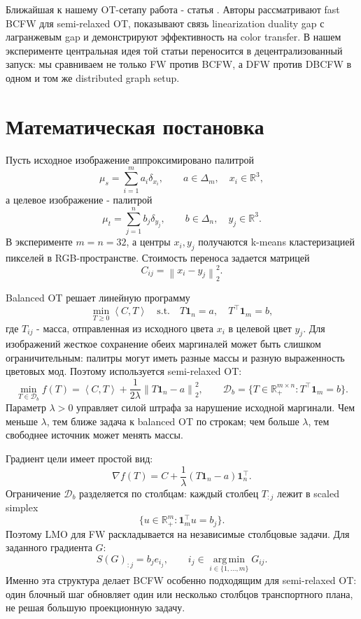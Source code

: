 \documentclass[11pt,a4paper]{article}
\newcommand{\R}{\mathbb{R}}
\newcommand{\1}{\mathbf{1}}
\newcommand{\argmin}{\operatorname*{arg\,min}}
\newcommand{\inner}[2]{\left\langle #1,#2\right\rangle}
\newcommand{\norm}[1]{\left\lVert #1\right\rVert}
\begin{document}
Ближайшая к нашему OT-сетапу работа - статья \citet{fukunaga2021fast}. Авторы рассматривают fast BCFW для semi-relaxed OT, показывают связь linearization duality gap с лагранжевым gap и демонстрируют эффективность на color transfer. В нашем эксперименте центральная идея той статьи переносится в децентрализованный запуск: мы сравниваем не только FW против BCFW, а DFW против DBCFW в одном и том же distributed graph setup.

\section{Математическая постановка}

Пусть исходное изображение аппроксимировано палитрой
\[
  \mu_s = \sum_{i=1}^{m} a_i \delta_{x_i},
  \qquad
  a \in \Delta_m,\quad x_i \in \R^3,
\]
а целевое изображение - палитрой
\[
  \mu_t = \sum_{j=1}^{n} b_j \delta_{y_j},
  \qquad
  b \in \Delta_n,\quad y_j \in \R^3.
\]
В эксперименте $m=n=32$, а центры $x_i,y_j$ получаются k-means кластеризацией пикселей в RGB-пространстве. Стоимость переноса задается матрицей
\[
  C_{ij} = \norm{x_i-y_j}_2^2.
\]

Balanced OT решает линейную программу
\[
  \min_{T \ge 0} \inner{C}{T}
  \quad \text{s.t.} \quad
  T\1_n=a,\quad T^\top\1_m=b,
\]
где $T_{ij}$ - масса, отправленная из исходного цвета $x_i$ в целевой цвет $y_j$. Для изображений жесткое сохранение обеих маргиналей может быть слишком ограничительным: палитры могут иметь разные массы и разную выраженность цветовых мод. Поэтому используется semi-relaxed OT:
\begin{equation}
\label{eq:semi-relaxed}
  \min_{T\in\mathcal{D}_b}
  f(T)
  =
  \inner{C}{T}
  +
  \frac{1}{2\lambda}\norm{T\1_n-a}_2^2,
  \qquad
  \mathcal{D}_b=\{T\in\R_+^{m\times n}:T^\top\1_m=b\}.
\end{equation}
Параметр $\lambda>0$ управляет силой штрафа за нарушение исходной маргинали. Чем меньше $\lambda$, тем ближе задача к balanced OT по строкам; чем больше $\lambda$, тем свободнее источник может менять массы.

Градиент цели имеет простой вид:
\begin{equation}
\label{eq:gradient}
  \nabla f(T) = C + \frac{1}{\lambda}(T\1_n-a)\1_n^\top.
\end{equation}
Ограничение $\mathcal{D}_b$ разделяется по столбцам: каждый столбец $T_{:j}$ лежит в scaled simplex
\[
  \{u\in\R_+^m:\1_m^\top u=b_j\}.
\]
Поэтому LMO для FW раскладывается на независимые столбцовые задачи. Для заданного градиента $G$:
\begin{equation}
\label{eq:lmo}
  S(G)_{:j}= b_j e_{i_j},
  \qquad
  i_j \in \argmin_{i\in\{1,\ldots,m\}} G_{ij}.
\end{equation}
Именно эта структура делает BCFW особенно подходящим для semi-relaxed OT: один блочный шаг обновляет один или несколько столбцов транспортного плана, не решая большую проекционную задачу.
\end{document}
